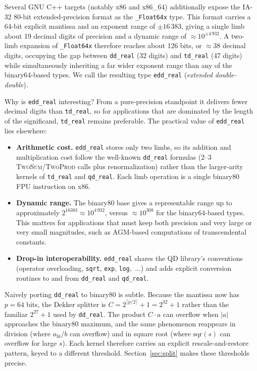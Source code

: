\documentclass[11pt,a4paper]{article}
\begin{document}
Several GNU C++ targets (notably x86 and x86\_64) additionally
expose the IA-32 80-bit extended-precision format as the
\texttt{\_Float64x} type.  This format carries a 64-bit explicit
mantissa and an exponent range of $\pm 16\,383$, giving a single
limb about 19 decimal digits of precision and a dynamic range of
$\approx 10^{\pm 4\,932}$.  A two-limb expansion of
\texttt{\_Float64x} therefore reaches about 126 bits, or
$\approx 38$ decimal digits, occupying the gap between
\texttt{dd\_real} (32 digits) and \texttt{td\_real} (47 digits)
while simultaneously inheriting a far wider exponent range than
any of the binary64-based types.  We call the resulting type
\texttt{edd\_real} (\emph{extended double-double}).

Why is \texttt{edd\_real} interesting?  From a pure-precision
standpoint it delivers fewer decimal digits than
\texttt{td\_real}, so for applications that are dominated by the
length of the significand, \texttt{td\_real} remains preferable.
The practical value of \texttt{edd\_real} lies elsewhere:

\begin{itemize}
  \item \textbf{Arithmetic cost.}  \texttt{edd\_real} stores only
    two limbs, so its addition and multiplication cost follow the
    well-known \texttt{dd\_real} formulas (2--3
    \textsc{TwoSum}/\textsc{TwoProd} calls plus renormalization)
    rather than the larger-arity kernels of \texttt{td\_real} and
    \texttt{qd\_real}.  Each limb operation is a single binary80
    FPU instruction on x86.
  \item \textbf{Dynamic range.}  The binary80 base gives a
    representable range up to approximately $2^{16383} \approx
    10^{4\,932}$, versus $\approx 10^{308}$ for the binary64-based
    types.  This matters for applications that must keep both
    precision and very large or very small magnitudes, such as
    AGM-based computations of transcendental constants.
  \item \textbf{Drop-in interoperability.}  \texttt{edd\_real}
    shares the QD library's conventions (operator overloading,
    \texttt{sqrt}, \texttt{exp}, \texttt{log},~$\ldots$) and adds
    explicit conversion routines to and from \texttt{dd\_real}
    and \texttt{qd\_real}.
\end{itemize}

Naively porting \texttt{dd\_real} to binary80 is subtle.  Because
the mantissa now has $p = 64$ bits, the Dekker splitter is
$C = 2^{\lceil p/2 \rceil} + 1 = 2^{32} + 1$ rather than the
familiar $2^{27}+1$ used by \texttt{dd\_real}.  The product $C \cdot a$
can overflow when $|a|$ approaches the binary80 maximum, and the
same phenomenon reappears in division (where $a_{\mathrm{hi}} / b$
can overflow) and in square root (where $\mathrm{sqr}(s)$ can
overflow for large $s$).  Each kernel therefore carries an explicit
rescale-and-restore pattern, keyed to a different threshold.
Section~\ref{sec:split} makes these thresholds precise.
\end{document}
